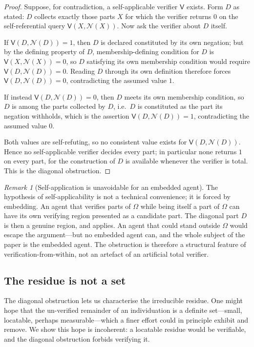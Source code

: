 \documentclass[11pt,a4paper]{article}
\theoremstyle{thmstyle}
\theoremstyle{definition}
\theoremstyle{remark}
\newtheorem{remark}[theorem]{Remark}
\newcommand{\Space}{\Omega}
\newcommand{\Neg}{\mathcal{N}}
\newcommand{\Ver}{\mathsf{V}}
\begin{document}
\begin{proof}
Suppose, for contradiction, a self-applicable verifier $\Ver$ exists. Form $D$ as
stated: $D$ collects exactly those parts $X$ for which the verifier returns $0$
on the self-referential query $\Ver(X,\Neg(X))$. Now ask the verifier about $D$
itself.

If $\Ver(D,\Neg(D))=1$, then $D$ is declared constituted by its own negation;
but by the defining property of $D$, membership-defining condition for $D$ is
$\Ver(X,\Neg(X))=0$, so $D$ satisfying its own membership condition would require
$\Ver(D,\Neg(D))=0$. Reading $D$ through its own definition therefore forces
$\Ver(D,\Neg(D))=0$, contradicting the assumed value $1$.

If instead $\Ver(D,\Neg(D))=0$, then $D$ meets its own membership condition, so
$D$ is among the parts collected by $D$, i.e.\ $D$ is constituted as the part its
negation withholds, which is the assertion $\Ver(D,\Neg(D))=1$, contradicting the
assumed value $0$.

Both values are self-refuting, so no consistent value exists for
$\Ver(D,\Neg(D))$. Hence no self-applicable verifier decides every part; in
particular none returns $1$ on every part, for the construction of $D$ is
available whenever the verifier is total. This is the diagonal obstruction.
\end{proof}

\begin{remark}[Self-application is unavoidable for an embedded agent]
\label{rem:self-app}
The hypothesis of self-applicability is not a technical convenience; it is forced
by embedding. An agent that verifies parts of $\Space$ while being itself a part
of $\Space$ can have its own verifying region presented as a candidate part. The
diagonal part $D$ is then a genuine region, and  applies. An
agent that could stand outside $\Space$ would escape the argument---but no
embedded agent can, and the whole subject of the paper is the embedded agent. The
obstruction is therefore a structural feature of verification-from-within, not an
artefact of an artificial total verifier.
\end{remark}

\subsection{The residue is not a set}

The diagonal obstruction lets us characterise the irreducible residue. One might
hope that the un-verified remainder of an individuation is a definite set---small,
locatable, perhaps measurable---which a finer effort could in principle exhibit
and remove. We show this hope is incoherent: a locatable residue would be
verifiable, and the diagonal obstruction forbids verifying it.
\end{document}
